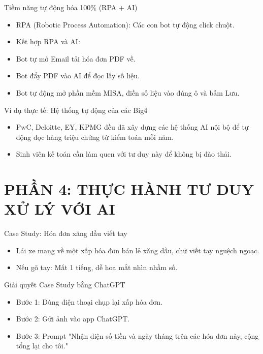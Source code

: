 \documentclass[aspectratio=169]{beamer}
\begin{document}
\begin{frame}{Tiềm năng tự động hóa 100\% (RPA + AI)}
    \begin{itemize}
        \item RPA (Robotic Process Automation): Các con bot tự động click chuột.
        \item Kết hợp RPA và AI:
        \item Bot tự mở Email tải hóa đơn PDF về.
        \item Bot đẩy PDF vào AI để đọc lấy số liệu.
        \item Bot tự động mở phần mềm MISA, điền số liệu vào đúng ô và bấm Lưu.
    \end{itemize}
\end{frame}


\begin{frame}{Ví dụ thực tế: Hệ thống tự động của các Big4}
    \begin{itemize}
        \item PwC, Deloitte, EY, KPMG đều đã xây dựng các hệ thống AI nội bộ để tự động đọc hàng triệu chứng từ kiểm toán mỗi năm.
        \item Sinh viên kế toán cần làm quen với tư duy này để không bị đào thải.
    \end{itemize}
\end{frame}


\section{PHẦN 4: THỰC HÀNH TƯ DUY XỬ LÝ VỚI AI}


\begin{frame}{Case Study: Hóa đơn xăng dầu viết tay}
    \begin{itemize}
        \item Lái xe mang về một xấp hóa đơn bán lẻ xăng dầu, chữ viết tay nguệch ngoạc.
        \item Nếu gõ tay: Mất 1 tiếng, dễ hoa mắt nhìn nhầm số.
    \end{itemize}
\end{frame}


\begin{frame}{Giải quyết Case Study bằng ChatGPT}
    \begin{itemize}
        \item Bước 1: Dùng điện thoại chụp lại xấp hóa đơn.
        \item Bước 2: Gửi ảnh vào app ChatGPT.
        \item Bước 3: Prompt "Nhận diện số tiền và ngày tháng trên các hóa đơn này, cộng tổng lại cho tôi."
    \end{itemize}
\end{frame}
\end{document}
